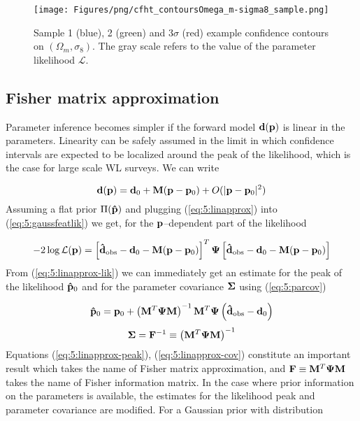 \begin{figure}
\begin{center}
\texttt{[image: Figures/png/cfht\_contoursOmega\_m-sigma8\_sample.png]}
\end{center}
\caption{Sample 1 (blue), 2 (green) and 3$\sigma$ (red) example confidence contours on $(\Omega_m,\sigma_8)$. The gray scale refers to the value of the parameter likelihood $\mathcal{L}$.}
\label{fig:5:contsample}
\end{figure}

\subsection{Fisher matrix approximation}
Parameter inference becomes simpler if the forward model $\mathbf{d}(\mathbf{p})$ is linear in the parameters. Linearity can be safely assumed in the limit in which confidence intervals are expected to be localized around the peak of the likelihood, which is the case for large scale WL surveys. We can write 

\begin{equation}
\label{eq:5:linapprox}
\mathbf{d}(\mathbf{p}) = \mathbf{d}_0 + \mathbf{M}(\mathbf{p}-\mathbf{p}_0) + O(\vert\mathbf{p}-\mathbf{p}_0\vert^2)
\end{equation}          
%
Assuming a flat prior $\Pi(\mathbf{\hat{p}})$ and plugging (\ref{eq:5:linapprox}) into (\ref{eq:5:gaussfeatlik}) we get, for the $\mathbf{p}$--dependent part of the likelihood

\begin{equation}
\label{eq:5:linapprox-lik}
-2\log\mathcal{L}(\mathbf{p}) = \left[\mathbf{\hat{d}}_{\rm obs}-\mathbf{d}_0-\mathbf{M}(\mathbf{p}-\mathbf{p}_0)\right]^T\mathbf{\Psi}\left[\mathbf{\hat{d}}_{\rm obs}-\mathbf{d}_0-\mathbf{M}(\mathbf{p}-\mathbf{p}_0)\right]
\end{equation}
%
From (\ref{eq:5:linapprox-lik}) we can immediately get an estimate for the peak of the likelihood $\mathbf{\hat{p}}_0$ and for the parameter covariance $\mathbf{\Sigma}$ using (\ref{eq:5:parcov})

\begin{equation}
\label{eq:5:linapprox-peak}
\mathbf{\hat{p}}_0 = \mathbf{p}_0 + \left(\mathbf{M}^T\mathbf{\Psi}\mathbf{M}\right)^{-1}\mathbf{M}^T\mathbf{\Psi}\left(\mathbf{\hat{d}}_{\rm obs}-\mathbf{d}_0\right)
\end{equation}
%
\begin{equation}
\label{eq:5:linapprox-cov}
\mathbf{\Sigma} = \mathbf{F}^{-1} \equiv \left(\mathbf{M}^T\mathbf{\Psi}\mathbf{M}\right)^{-1} 
\end{equation}
%
Equations (\ref{eq:5:linapprox-peak}), (\ref{eq:5:linapprox-cov}) constitute an important result which takes the name of Fisher matrix approximation, and $\mathbf{F}\equiv\mathbf{M}^T\mathbf{\Psi}\mathbf{M}$ takes the name of Fisher information matrix. In the case where prior information on the parameters is available, the estimates for the likelihood peak and parameter covariance are modified. For a Gaussian prior with distribution

